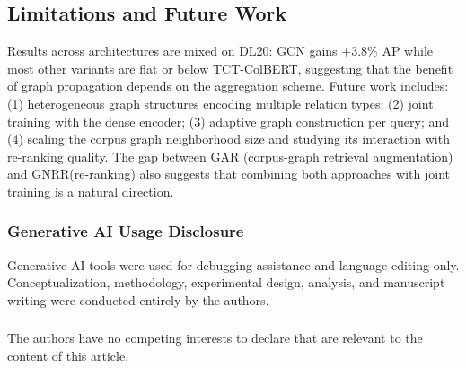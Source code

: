 \documentclass[runningheads]{llncs}
\newcommand{\ModelName}{GNRR\xspace}
\begin{document}
\subsection*{Limitations and Future Work}
Results across architectures are mixed on DL20: GCN gains $+3.8\%$ AP while most other variants are flat or below TCT-ColBERT, suggesting that the benefit of graph propagation depends on the aggregation scheme. Future work includes: (1) heterogeneous graph structures encoding multiple relation types; (2) joint training with the dense encoder; (3) adaptive graph construction per query; and (4) scaling the corpus graph neighborhood size and studying its interaction with re-ranking quality. The gap between GAR (corpus-graph retrieval augmentation) and \ModelName (re-ranking) also suggests that combining both approaches with joint training is a natural direction.

\begin{credits}
\subsubsection{Generative AI Usage Disclosure}
Generative AI tools were used for debugging assistance and language editing only. Conceptualization, methodology, experimental design, analysis, and manuscript writing were conducted entirely by the authors.

\subsubsection{\discintname}
The authors have no competing interests to declare that are relevant to the content of this article.
\end{credits}

%
%


\end{document}
